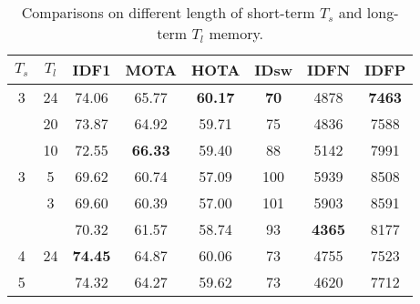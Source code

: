 \begin{table}
\footnotesize
\begin{tabular}{cc|cccccc}
\toprule[1.5pt]
        \textbf{$T_s$} & \textbf{$T_l$} & \textbf{IDF1} & \textbf{MOTA} & \textbf{HOTA} & \textbf{IDsw} & \textbf{IDFN} & \textbf{IDFP} \\\hline
         3 & 24 & 74.06& 65.77& \textbf{60.17} & \textbf{70} & 4878 & \textbf{7463}\\\hline
        \multirow{5}{*}{3}& 20 &73.87&  64.92 & 59.71 & 75& 4836 & 7588\\
        & 10 & 72.55 & \textbf{66.33}& 59.40 & 88 & 5142 &7991\\
        & 5 & 69.62 & 60.74 & 57.09 & 100 & 5939 & 8508\\
        & 3 & 69.60 & 60.39 & 57.00 & 101 & 5903 & 8591\\\hline
        2 & \multirow{3}{*}{24} & 70.32& 61.57& 58.74& 93& \textbf{4365} & 8177\\
        4 & &\textbf{74.45} & 64.87& 60.06 & 73& 4755& 7523\\
        5 & &74.32 & 64.27 & 59.62& 73& 4620& 7712\\
        
\bottomrule[1.5pt]
    \end{tabular}
\caption{Comparisons on different length of short-term $T_s$ and long-term $T_l$ memory.}
\label{tab:ablation:memory_length}
\end{table}